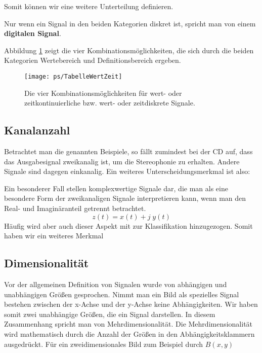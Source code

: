 Somit können wir eine weitere Unterteilung definieren.

Nur wenn ein Signal in den beiden Kategorien diskret ist, spricht man von einem {\bf digitalen Signal}.


Abbildung \ref{pic:TabelleWertZeit} zeigt die vier
Kombinationsmöglichkeiten, die sich durch die beiden Kategorien
Wertebereich und Definitionsbereich ergeben.

\begin{figure}[H]
\begin{center}
\texttt{[image: ps/TabelleWertZeit]}
\caption{\label{pic:TabelleWertZeit} Die vier
Kombinationsmöglichkeiten für wert- oder zeitkontinuierliche bzw.
wert- oder zeitdiskrete Signale.}
\end{center}
\end{figure}

\subsection{Kanalanzahl}
Betrachtet man die genannten Beispiele, so fällt zumindest bei der CD auf, dass
das Ausgabesignal zweikanalig ist, um die Stereophonie zu erhalten. Andere Signale
sind dagegen einkanalig. Ein weiteres Unterscheidungsmerkmal ist also:


Ein besonderer Fall stellen komplexwertige Signale dar, die man als eine besondere
Form der zweikanaligen Signale interpretieren kann, wenn man den Real- und Imaginäranteil
getrennt betrachtet.
\[
    z(t) = x(t) + j\;y(t)
\]
Häufig wird aber auch dieser Aspekt mit zur Klassifikation hinzugezogen.
Somit haben wir ein weiteres Merkmal


\subsection{Dimensionalität}
Vor der allgemeinen Definition von Signalen wurde von abhängigen und unabhängigen Größen gesprochen.
Nimmt man ein Bild als spezielles Signal bestehen zwischen der x-Achse und der y-Achse
keine Abhängigkeiten. Wir haben somit zwei unabhängige Größen, die ein Signal darstellen.
In diesem Zusammenhang spricht man von Mehrdimensionalität. Die Mehrdimensionalität
wird mathematisch durch die Anzahl der Größen in den Abhängigkeitsklammern ausgedrückt.
Für ein zweidimensionales Bild zum Beispiel durch $B(x,y)$

